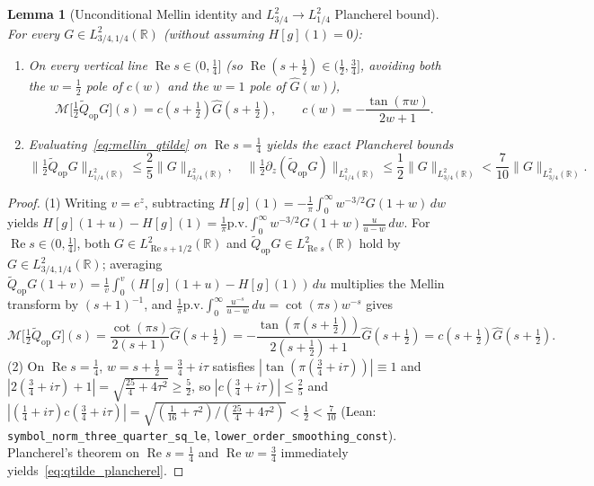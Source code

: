 \documentclass[11pt,a4paper]{article}
\newtheorem{lem}{Lemma}[section]
\begin{document}
\begin{lem}[Unconditional Mellin identity and $L^2_{3/4}\to L^2_{1/4}$ Plancherel bound]\label{lem:mellin_plancherel}
For every $G\in L^2_{3/4,1/4}(\mathbb{R})$ (without assuming $H[g](1)=0$):
\begin{enumerate}\setlength\itemsep{1pt}
\item On every vertical line $\operatorname{Re}s\in(0,\tfrac14]$ (so $\operatorname{Re}(s+\tfrac12)\in(\tfrac12,\tfrac34]$, avoiding both the $w=\tfrac12$ pole of $c(w)$ and the $w=1$ pole of $\widehat{G}(w)$),
  \begin{equation}\label{eq:mellin_qtilde}
  \mathcal{M}\bigl[\tfrac12\widetilde{Q}_{\mathrm{op}}G\bigr](s) = c\!\left(s+\tfrac12\right)\widehat{G}\!\left(s+\tfrac12\right),
  \qquad c(w) = -\frac{\tan(\pi w)}{2w+1}.
  \end{equation}
\item Evaluating~\eqref{eq:mellin_qtilde} on $\operatorname{Re}s=\frac{1}{4}$ yields the exact Plancherel bounds
  \begin{equation}\label{eq:qtilde_plancherel}
  \bigl\|\tfrac12\widetilde{Q}_{\mathrm{op}}G\bigr\|_{L^2_{1/4}(\mathbb{R})}
  \le \frac{2}{5}\|G\|_{L^2_{3/4}(\mathbb{R})}, \quad
  \bigl\|\tfrac12\partial_z(\widetilde{Q}_{\mathrm{op}}G)\bigr\|_{L^2_{1/4}(\mathbb{R})}
  \le \frac{1}{2}\|G\|_{L^2_{3/4}(\mathbb{R})} < \frac{7}{10}\|G\|_{L^2_{3/4}(\mathbb{R})}.
  \end{equation}
\end{enumerate}
\end{lem}
\begin{proof}
(1) Writing $v=e^z$, subtracting $H[g](1)=-\frac{1}{\pi}\int_0^\infty w^{-3/2}G(1+w)\,dw$ yields
$H[g](1+u)-H[g](1)=\frac{1}{\pi}\mathrm{p.v.}\int_0^\infty w^{-3/2}G(1+w)\frac{u}{u-w}\,dw$.
For $\operatorname{Re}s\in(0,\tfrac14]$, both $G\in L^2_{\operatorname{Re}s+1/2}(\mathbb{R})$ and $\widetilde{Q}_{\mathrm{op}}G\in L^2_{\operatorname{Re}s}(\mathbb{R})$ hold by $G\in L^2_{3/4,1/4}(\mathbb{R})$; averaging $\widetilde{Q}_{\mathrm{op}}G(1+v)=\frac{1}{v}\int_0^v(H[g](1+u)-H[g](1))\,du$
multiplies the Mellin transform by $(s+1)^{-1}$, and $\frac{1}{\pi}\mathrm{p.v.}\int_0^\infty\frac{u^{-s}}{u-w}\,du=\cot(\pi s)w^{-s}$ gives
\[
\mathcal{M}\bigl[\tfrac12\widetilde{Q}_{\mathrm{op}}G\bigr](s)
= \frac{\cot(\pi s)}{2(s+1)}\widehat{G}\!\left(s+\tfrac12\right)
= -\frac{\tan(\pi(s+\tfrac12))}{2(s+\tfrac12)+1}\widehat{G}\!\left(s+\tfrac12\right)
= c\!\left(s+\tfrac12\right)\widehat{G}\!\left(s+\tfrac12\right).
\]
(2) On $\operatorname{Re}s=\tfrac14$, $w=s+\tfrac12=\tfrac34+i\tau$ satisfies
$|\tan(\pi(\tfrac34+i\tau))|\equiv 1$ and $|2(\tfrac34+i\tau)+1|=\sqrt{\tfrac{25}{4}+4\tau^2}\ge\tfrac52$,
so $|c(\tfrac34+i\tau)|\le\tfrac25$ and $|(\tfrac14+i\tau)c(\tfrac34+i\tau)|=\sqrt{(\tfrac{1}{16}+\tau^2)/(\tfrac{25}{4}+4\tau^2)}<\tfrac12<\tfrac{7}{10}$
(Lean: \texttt{symbol\_norm\_three\_quarter\_sq\_le}, \texttt{lower\_order\_smoothing\_const}).
Plancherel's theorem on $\operatorname{Re}s=\tfrac14$ and $\operatorname{Re}w=\tfrac34$ immediately yields~\eqref{eq:qtilde_plancherel}.
\end{proof}
\end{document}
